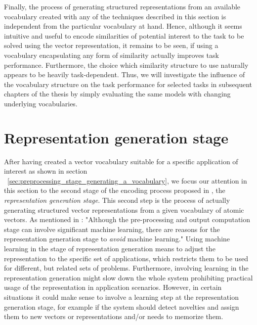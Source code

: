 Finally, the process of generating structured representations from an available vocabulary created with any of the techniques described in this section is independent from the particular vocabulary at hand.
Hence, although it seems intuitive and useful to encode similarities of potential interest to the task to be solved using the vector representation, it remains to be seen, if using a vocabulary encapsulating any form of similarity actually improves task performance.
Furthermore, the choice which similarity structure to use naturally appears to be heavily task-dependent.
Thus, we will investigate the influence of the vocabulary structure on the task performance for selected tasks in subsequent chapters of the thesis by simply evaluating the same models with changing underlying vocabularies.

\section{Representation generation stage}%
\label{sec:representation_generation_stage}

After having created a vector vocabulary suitable for a specific application of interest as shown in section ~\ref{sec:preprocessing_stage_generating_a_vocabulary}, we focus our attention in this section to the second stage of the encoding process proposed in \cite{Gallant2013}, the \emph{representation generation stage}.
This second step is the process of actually generating structured vector representations from a given vocabulary of atomic vectors.
As mentioned in \cite{Gallant2013}: "Although the pre-processing and output computation stage can involve significant machine learning, there are reasons for the representation generation stage to \emph{avoid} machine learning."
Using machine learning in the stage of representation generation means to adjust the representation to the specific set of applications, which restricts them to be used for different, but related sets of problems.
Furthermore, involving learning in the representation generation might slow down the whole system prohibiting practical usage of the representation in application scenarios.
However, in certain situations it could make sense to involve a learning step at the representation generation stage, for example if the system should detect novelties and assign them to new vectors or representations and/or needs to memorize them.

